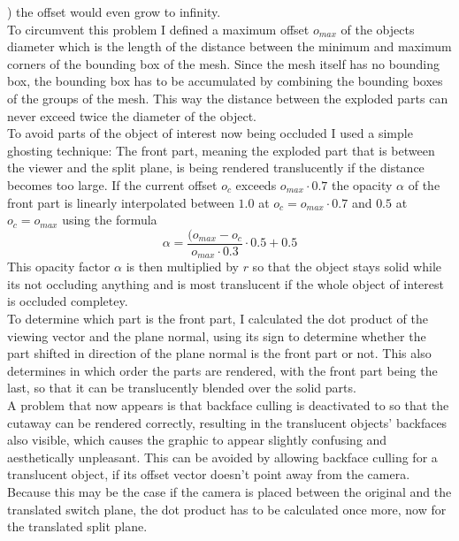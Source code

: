 ) the offset would even grow to infinity.\\
To circumvent this problem I defined a maximum offset $o_{max}$ of the objects diameter which is the length of the distance between the minimum and maximum corners of the bounding box of the mesh. Since the mesh itself has no bounding box, the bounding box has to be accumulated by combining the bounding boxes of the groups of the mesh. This way the distance between the exploded parts can never exceed twice the diameter of the object.\\
To avoid parts of the object of interest now being occluded I used a simple ghosting technique: 
The front part, meaning the exploded part that is between the viewer and the split plane, is being rendered translucently if the distance becomes too large.
If the current offset $o_c$ exceeds $o_{max} \cdot 0.7$ the opacity $\alpha$ of the front part is linearly interpolated between $1.0$ at $o_c = o_{max} \cdot 0.7$ and $0.5$ at  $o_c = o_{max}$ using the formula
\begin{equation}
	\alpha = \frac{( o_{max}-o_c}{o_{max} \cdot 0.3} \cdot 0.5 + 0.5
\end{equation}
This opacity factor $\alpha$ is then multiplied by $r$ so that the object stays solid while its not occluding anything and is most translucent if the whole object of interest is occluded completey.\\
To determine which part is the front part, I calculated the dot product of the viewing vector and the plane normal, using its sign to determine whether the part shifted in direction of the plane normal is the front part or not. This also determines in which order the parts are rendered, with the front part being the last, so that it can be translucently blended over the solid parts.\\
A problem that now appears is that backface culling is deactivated to so that the cutaway can be rendered correctly, resulting in the translucent objects' backfaces also visible, which causes the graphic to appear slightly confusing and aesthetically unpleasant. This can be avoided by allowing backface culling for a translucent object, if its offset vector doesn't point away from the camera. Because this may be the case if the camera is placed between the original and the translated switch plane, the dot product has to be calculated once more, now for the translated split plane.\\

